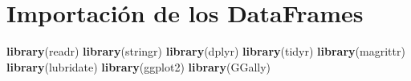 \documentclass[water,article,submit,pdftex,moreauthors]{Definitions/mdpi}
\newenvironment{Shaded}{\begin{snugshade}}{\end{snugshade}}
\newcommand{\FunctionTok}[1]{\textcolor[rgb]{0.13,0.29,0.53}{\textbf{#1}}}
\newcommand{\NormalTok}[1]{#1}
\begin{document}
\section{Importación de los
DataFrames}\label{importaciuxf3n-de-los-dataframes}

\begin{Shaded}
\begin{Highlighting}[]
\FunctionTok{library}\NormalTok{(readr)}
\FunctionTok{library}\NormalTok{(stringr)}
\FunctionTok{library}\NormalTok{(dplyr)}
\FunctionTok{library}\NormalTok{(tidyr)}
\FunctionTok{library}\NormalTok{(magrittr)}
\FunctionTok{library}\NormalTok{(lubridate)}
\FunctionTok{library}\NormalTok{(ggplot2)}
\FunctionTok{library}\NormalTok{(GGally)}
\end{Highlighting}
\end{Shaded}
\end{document}
